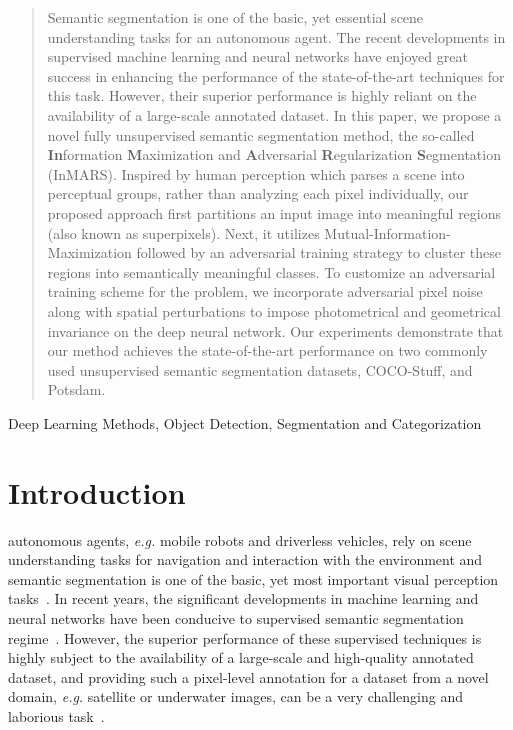 \documentclass[letterpaper, 10 pt, journal, twoside]{IEEEtran}
\newcommand{\eg}{\emph{e.g.}\xspace}
\begin{document}
\begin{abstract}
Semantic segmentation is one of the basic, yet essential scene understanding tasks for an autonomous agent. The recent developments in supervised machine learning and neural networks have enjoyed great success in enhancing the performance of the state-of-the-art techniques for this task. However, their superior performance is highly reliant on the availability of a large-scale annotated dataset. 
In this paper, we  propose  a  novel fully  unsupervised  semantic  segmentation  method, the so-called \textbf{In}formation \textbf{M}aximization and \textbf{A}dversarial \textbf{R}egularization \textbf{S}egmentation  (InMARS). Inspired by human perception which parses a scene into perceptual groups, rather than analyzing each pixel individually, our proposed approach first partitions an input image into meaningful regions (also known as superpixels). Next, it utilizes Mutual-Information-Maximization followed by an adversarial training strategy to cluster these regions into semantically meaningful classes.
To customize an adversarial training scheme for the problem, we incorporate adversarial pixel noise along with spatial perturbations to impose photometrical and geometrical invariance on the deep neural network. Our experiments demonstrate that our method achieves the state-of-the-art performance on two commonly used unsupervised semantic segmentation datasets, COCO-Stuff, and Potsdam.
\end{abstract}

\begin{IEEEkeywords}
Deep Learning Methods, Object Detection, Segmentation and Categorization
\end{IEEEkeywords}


\IEEEpeerreviewmaketitle

\section{Introduction}
 autonomous agents, \eg mobile robots and driverless vehicles, rely on scene understanding tasks for navigation and interaction with the environment and semantic segmentation is one of the basic, yet most important visual perception tasks~\cite{DeepLab, RefineNet, HRNet,  PSPNet}. In recent years, the significant developments in machine learning and neural networks have been conducive to supervised semantic segmentation regime~\cite{DeepLab, RefineNet, FCN}. However, the superior performance of these supervised techniques is highly subject to the availability of a large-scale and high-quality annotated dataset, and providing such a pixel-level annotation for a dataset from a novel domain, \eg satellite or underwater images, can be a very challenging and laborious task~\cite{ARL5, ARL17, IIC38}.
\end{document}
